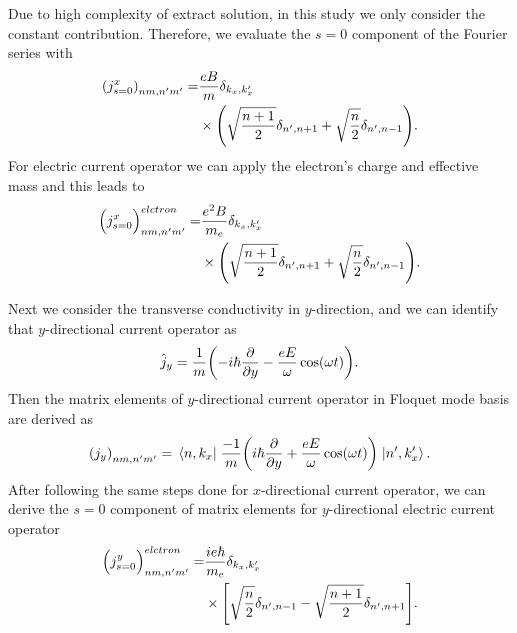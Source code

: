 Due to high complexity of extract solution, in this study we only consider the constant contribution. Therefore, we evaluate the $s=0$ component of the Fourier series with
\begin{equation} \label{eq_d10}
  \begin{aligned}
      \qty({j}^x_{s=0})_{nm,n'm'} =&
      \frac{eB}{{m}}
      \delta_{k_x,k'_x} \\
      & \times
      \qty(\sqrt{\frac{n+1}{2}} \delta_{n',n+1} + \sqrt{\frac{n}{2}}
      \delta_{n',n-1}).
  \end{aligned}
\end{equation}
For electric current operator we can apply the electron's charge and effective mass and this leads to
\begin{equation} \label{eq_d11}
  \begin{aligned}
      \Big({j}^x_{s=0}\Big)_{nm,n'm'}^{elctron} =&
      \frac{e^2B}{{m_e}}
      \delta_{k_x,k'_x}\\
      & \times
      \qty(\sqrt{\frac{n+1}{2}} \delta_{n',n+1} + \sqrt{\frac{n}{2}}
      \delta_{n',n-1}).
  \end{aligned}
\end{equation}

Next we consider the transverse conductivity in $y$-direction, and we can identify that $y$-directional current operator as
\begin{equation} \label{eq_d12}
  \hat{j}_y = \frac{1}{m} \qty(-i\hbar\pdv{y} - \frac{eE}{\omega}\cos(\omega t)).
\end{equation}
Then the matrix elements of $y$-directional current operator in Floquet mode basis are derived as
\begin{equation} \label{eq_d13}
  \qty({j}_y)_{nm,n'm'} =
  \mel{n,k_x}{\;\frac{-1}{m} \qty(i\hbar\pdv{y} + \frac{eE}{\omega}\cos(\omega t))\;}{n',k'_x}.
\end{equation}
After following the same steps done for $x$-directional current operator, we can derive the $s=0$ component of matrix elements for $y$-directional electric current operator
\begin{equation} \label{eq_d14}
  \begin{aligned}
    \Big({j}^y_{s=0}\Big)_{nm,n'm'}^{elctron} = &
    \frac{ie\hbar}{{m_e}}
    \delta_{k_x,k'_x} \\
    & \times
    \qty[
    \sqrt{\frac{n}{2}} \delta_{n',n-1}
    - \sqrt{\frac{n+1}{2}} \delta_{n',n+1}
    ].
  \end{aligned}
\end{equation}
